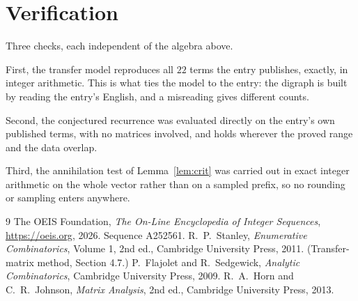 \documentclass[11pt,a4paper]{article}
\theoremstyle{plain}
\theoremstyle{definition}
\begin{document}
\section{Verification}

Three checks, each independent of the algebra above.

First, the transfer model reproduces all $22$ terms the entry publishes, exactly, in
integer arithmetic. This is what ties the model to the entry: the digraph is built by reading
the entry's English, and a misreading gives different counts.

Second, the conjectured recurrence was evaluated directly on the entry's own published terms,
with no matrices involved, and holds wherever the proved range and the data overlap.

Third, the annihilation test of Lemma~\ref{lem:crit} was carried out in exact integer
arithmetic on the whole vector rather than on a sampled prefix, so no rounding or sampling
enters anywhere.

\begin{thebibliography}{9}
 The OEIS Foundation, \emph{The On-Line Encyclopedia of Integer
Sequences}, \url{https://oeis.org}, 2026. Sequence A252561.
 R.~P.~Stanley, \emph{Enumerative Combinatorics}, Volume 1, 2nd ed.,
Cambridge University Press, 2011. (Transfer-matrix method, Section 4.7.)
 P.~Flajolet and R.~Sedgewick, \emph{Analytic Combinatorics}, Cambridge
University Press, 2009.
 R.~A.~Horn and C.~R.~Johnson, \emph{Matrix Analysis}, 2nd ed., Cambridge
University Press, 2013.
\end{thebibliography}
\end{document}
